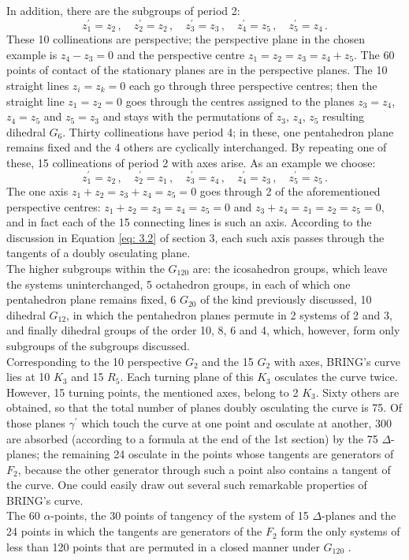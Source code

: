 \documentclass[leqno]{article}
\begin{document}
In addition, there are the subgroups of period 2:
\[
z_1^\prime = z_2 \, , \quad z_2^\prime = z_2 \, , \quad z_3^\prime = z_3 \, , \quad z_4^\prime = z_5 \, , \quad z_5^\prime = z_4 \, . 
\]
These 10 collineations are perspective; the perspective plane in the chosen example is $z_4 - z_3 = 0$ and the perspective centre $z_1 = z_2 = z_3 = z_4+z_5$. The 60 points of contact of the stationary planes are in the perspective planes. The 10 straight lines $z_i=z_k=0$ each go through three perspective centres; then the straight line $z_1 = z_2 = 0$ goes through the centres assigned to the planes $z_3=z_4$, $z_4=z_5$ and $z_5 = z_3$ and stays with the permutations of $z_3$, $z_4$, $z_5$ resulting dihedral $G_6$. Thirty collineations have period 4; in these, one pentahedron plane remains fixed and the 4 others are cyclically interchanged. By repeating one of these, 15 collineations of period 2 \guillemotright with axes\guillemotright{} arise. As an example we choose:
\[
z_1^\prime = z_2 \, , \quad z_2^\prime = z_1 \, , \quad z_3^\prime = z_4 \, , \quad z_4^\prime = z_3 \, , \quad z_5^\prime = z_5 \, . 
\]
The one axis $z_1 + z_2 = z_3 + z_4 = z_5 = 0$ goes through 2 of the aforementioned perspective centres: $z_1 +z_2 = z_3 = z_4 = z_5 = 0$ and $z_3 + z_4 = z_1 = z_2 = z_5=0$, and in fact each of the 15 connecting lines is such an axis. According to the discussion in Equation \eqref{eq: 3.2} of section 3, each such axis passes through the tangents of a doubly osculating plane. \\
The higher subgroups within the $G_{120}$ are: the icosahedron groups, which leave the systems uninterchanged, 5 octahedron groups, in each of which one pentahedron plane remains fixed, 6 $G_{20}$ of the kind previously discussed, 10 dihedral $G_{ 12}$, in which the pentahedron planes permute in 2 systems of 2 and 3, and finally dihedral groups of the order 10, 8, 6 and 4, which, however, form only subgroups of the subgroups discussed. \\
Corresponding to the 10 perspective $G_2$ and the 15 $G_2$ \guillemotright with axes\guillemotright, BRING's curve lies at 10 $K_3$ and 15 $R_5$. Each turning plane of this $K_3$ osculates the curve twice. However, 15 turning points, the mentioned axes, belong to 2 $K_3$. Sixty others are obtained, so that the total number of planes doubly osculating the curve is 75. Of those planes $\gamma^\prime$ which touch the curve at one point and osculate at another, 300 are absorbed (according to a formula at the end of the 1st section) by the 75 $\Delta$-planes; the remaining 24 osculate in the points whose tangents are generators of $F_2$, because the other generator through such a point also contains a tangent of the curve. One could easily draw out several such remarkable properties of BRING's curve. \\
The 60 $\alpha$-points, the 30 points of tangency of the system of 15 $\Delta$-planes and the 24 points in which the tangents are generators of the $F_2$ form the only systems of less than 120 points that are permuted in a closed manner under $G_{120}$ .
\end{document}
